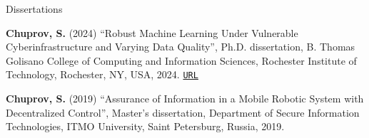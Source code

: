 \begin{rSection}{Dissertations}
\begin{enumerate}[label=[D{{\arabic*}]}]

\item  \textbf{Chuprov, S.} (2024) ``Robust Machine Learning Under Vulnerable Cyberinfrastructure and Varying Data Quality'', Ph.D. dissertation, B. Thomas Golisano College of Computing and Information Sciences, Rochester Institute of Technology, Rochester, NY, USA, 2024. \href{https://www.proquest.com/openview/e54b39dac756a628c82e402e71182a0d/1?pq-origsite=gscholar&cbl=18750&diss=y}{\nolinkurl{URL}}

\item \textbf{Chuprov, S.} (2019) ``Assurance of Information in a Mobile Robotic System with Decentralized Control'', Master's dissertation, Department of Secure Information Technologies, ITMO University, Saint Petersburg, Russia, 2019. 

\end{enumerate}
\end{rSection}

